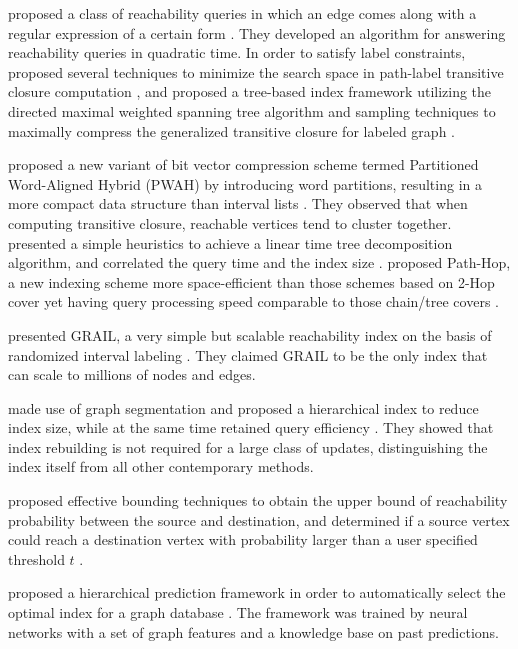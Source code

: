 \documentclass[12pt,conference,compsocconf]{../IEEEtran}
\begin{document}
 proposed a class of reachability queries in which an edge comes along with a regular expression of a certain form \citep{1052}. They developed an algorithm for answering reachability queries in quadratic time. In order to satisfy label constraints,  proposed several techniques to minimize the search space in path-label transitive closure computation \citep{1055}, and  proposed a tree-based index framework utilizing the directed maximal weighted spanning tree algorithm and sampling techniques to maximally compress the generalized transitive closure for labeled graph \citep{1057}.

 proposed a new variant of bit vector compression scheme termed Partitioned Word-Aligned Hybrid (PWAH) by introducing word partitions, resulting in a more compact data structure than interval lists \citep{1054}. They observed that when computing transitive closure, reachable vertices tend to cluster together.  presented a simple heuristics to achieve a linear time tree decomposition algorithm, and correlated the query time and the index size \citep{1058}.  proposed Path-Hop, a new indexing scheme more space-efficient than those schemes based on 2-Hop cover yet having query processing speed comparable to those chain/tree covers \citep{1060}.

 presented GRAIL, a very simple but scalable reachability index on the basis of randomized interval labeling \citep{1059}. They claimed GRAIL to be the only index that can scale to millions of nodes and edges.

 made use of graph segmentation and proposed a hierarchical index to reduce index size, while at the same time retained query efficiency \citep{1053}. They showed that index rebuilding is not required for a large class of updates, distinguishing the index itself from all other contemporary methods.

 proposed effective bounding techniques to obtain the upper bound of reachability probability between the source and destination, and determined if a source vertex could reach a destination vertex with probability larger than a user specified threshold $t$ \citep{1056}.

 proposed a hierarchical prediction framework in order to automatically select the optimal index for a graph database \citep{1061}. The framework was trained by neural networks with a set of graph features and a knowledge base on past predictions.
\end{document}
